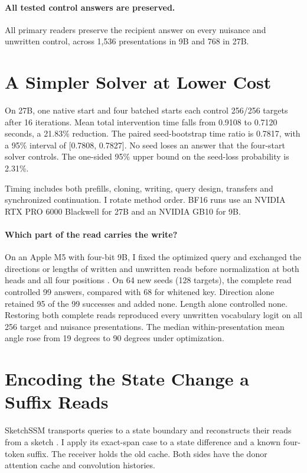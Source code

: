 \documentclass[letterpaper]{article}
\begin{document}
\paragraph{All tested control answers are preserved.}
All primary readers preserve the recipient answer on every nuisance and unwritten control, across 1,536 presentations in 9B and 768 in 27B.

\section{A Simpler Solver at Lower Cost}
On 27B, one native start and four batched starts each control 256/256
targets after 16 iterations. Mean total intervention time falls from 0.9108 to
0.7120 seconds, a 21.83\% reduction. The paired seed-bootstrap time
ratio is 0.7817, with a 95\% interval of [0.7808, 0.7827]. No seed loses
an answer that the four-start solver controls. The one-sided 95\% upper bound on the
seed-loss probability is 2.31\%.

Timing includes both prefills, cloning, writing, query design, transfers
and synchronized continuation. I rotate method order. BF16 runs use
an NVIDIA RTX PRO 6000 Blackwell for 27B and an NVIDIA GB10 for 9B.

\paragraph{Which part of the read carries the write?}
On an Apple M5 with four-bit 9B, I fixed the optimized query and exchanged the directions or lengths of written and unwritten reads before normalization at both heads and all four positions \citep{aparin2026}.
On 64 new seeds (128 targets), the complete read controlled 99 answers, compared with 68 for whitened key. Direction alone retained 95 of the 99 successes and added none. Length alone controlled none. Restoring both complete reads reproduced every unwritten vocabulary logit on all 256 target and nuisance presentations. The median within-presentation mean angle rose from 19 degrees to 90 degrees under optimization.

\section{Encoding the State Change a Suffix Reads}
SketchSSM transports queries to a state boundary and reconstructs their reads from a sketch \citep{kwon2026}. I apply its exact-span case to a state difference and a known four-token suffix. The receiver holds the old cache. Both sides have the donor attention cache and convolution histories.
\end{document}
